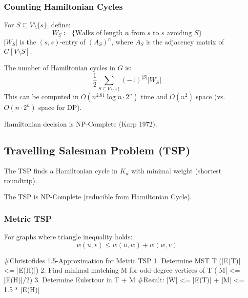 \subsubsection{Counting Hamiltonian Cycles}

\begin{definition}
	For $S \subseteq V \setminus \{s\}$, define:
	$$W_S \coloneqq \{ \text{Walks of length } n \text{ from } s \text{ to } s \text{ avoiding } S \}$$
	$|W_S|$ is the $(s,s)$-entry of $(A_S)^n$, where $A_S$ is the adjacency matrix of $G[V \setminus S]$.
\end{definition}

\begin{theorem}
	The number of Hamiltonian cycles in $G$ is:
	$$\frac{1}{2} \sum_{S \subseteq V \setminus \{s\}} (-1)^{|S|} |W_S|$$
	This can be computed in $O(n^{2.81} \log n \cdot 2^n)$ time and $O(n^2)$ space (vs. $O(n \cdot 2^n)$ space for DP).
\end{theorem}

\begin{theorem}
	Hamiltonian decision is NP-Complete (Karp 1972).
\end{theorem}

\subsection{Travelling Salesman Problem (TSP)}

The TSP finds a Hamiltonian cycle in $K_n$ with minimal weight (shortest roundtrip).

\begin{theorem}
	The TSP is NP-Complete (reducible from Hamiltonian Cycle).
\end{theorem}

\subsubsection{Metric TSP}
For graphs where triangle inequality holds:
$$w(u,v) \le w(u,w) + w(w,v)$$


\begin{algorithm}
	#Christofides 1.5-Approximation for Metric TSP
	1. Determine MST T (|E(T)| <= |E(H)|)
	2. Find minimal matching M for odd-degree vertices of T (|M| <= |E(H)|/2)
	3. Determine Eulertour in T + M
	#Result: |W| <= |E(T)| + |M| <= 1.5 * |E(H)|
\end{algorithm}

